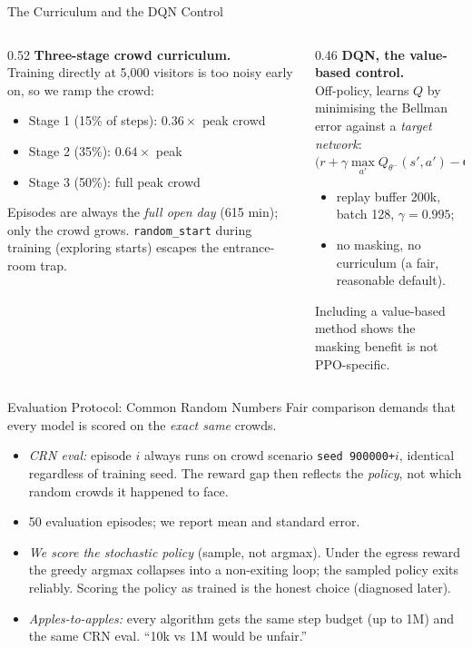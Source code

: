 \documentclass[aspectratio=169, 11pt]{beamer}
\newcommand{\thead}[1]{\textbf{#1}}
\newcommand{\emp}[1]{\textit{#1}}
\newcommand{\code}[1]{\texttt{\small #1}}
\begin{document}
\begin{frame}{The Curriculum and the DQN Control}
\footnotesize
\begin{columns}[T]
\begin{column}{0.52\textwidth}
\thead{Three-stage crowd curriculum.}\\
Training directly at 5{,}000 visitors is too noisy early on, so we ramp the crowd:
\begin{itemize}\setlength\itemsep{1pt}
\item Stage 1 (15\% of steps): $0.36\times$ peak crowd
\item Stage 2 (35\%): $0.64\times$ peak
\item Stage 3 (50\%): full peak crowd
\end{itemize}
Episodes are always the \emp{full open day} (615 min); only the crowd grows.
\code{random\_start} during training (exploring starts) escapes the entrance-room trap.
\end{column}
\begin{column}{0.46\textwidth}
\thead{DQN, the value-based control.}\\
Off-policy, learns $Q$ by minimising the Bellman error against a \emp{target network}:
\[
\big(r+\gamma\max_{a'}Q_{\theta^-}(s',a')-Q_\theta(s,a)\big)^2
\]
\begin{itemize}\setlength\itemsep{1pt}
\item replay buffer 200k, batch 128, $\gamma=0.995$;
\item no masking, no curriculum (a fair, reasonable default).
\end{itemize}
Including a value-based method shows the masking benefit is not PPO-specific.
\end{column}
\end{columns}
\end{frame}

\begin{frame}{Evaluation Protocol: Common Random Numbers}
\footnotesize
Fair comparison demands that every model is scored on the \emp{exact same} crowds.
\begin{itemize}\setlength\itemsep{2pt}
\item \emp{CRN eval:} episode $i$ always runs on crowd scenario \code{seed 900000+}$i$,
      identical regardless of training seed. The reward gap then reflects the
      \emp{policy}, not which random crowds it happened to face.
\item 50 evaluation episodes; we report mean and standard error.
\item \emp{We score the stochastic policy} (sample, not argmax). Under the egress reward
      the greedy argmax collapses into a non-exiting loop; the sampled policy exits
      reliably. Scoring the policy as trained is the honest choice (diagnosed later).
\item \emp{Apples-to-apples:} every algorithm gets the same step budget (up to 1M) and
      the same CRN eval. ``10k vs 1M would be unfair.''
\end{itemize}
\end{frame}
\end{document}
